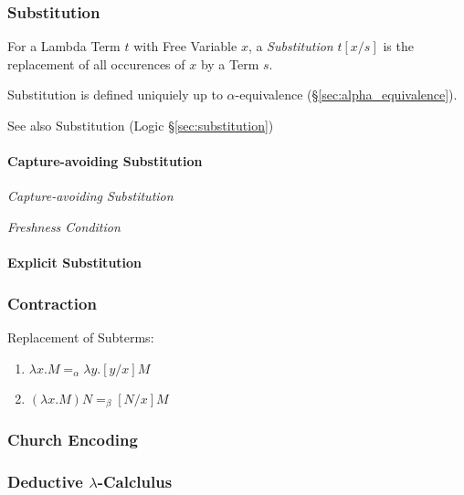 \subsubsection{Substitution}\label{sec:lambda_substitution}

For a Lambda Term $t$ with Free Variable $x$, a \emph{Substitution}
$t[x/s]$ is the replacement of all occurences of $x$ by a Term $s$.

Substitution is defined uniquiely up to $\alpha$-equivalence
(\S\ref{sec:alpha_equivalence}).

\fist See also Substitution (Logic \S\ref{sec:substitution})



\paragraph{Capture-avoiding Substitution}\label{sec:capture_avoiding}\hfill

\emph{Capture-avoiding Substitution}

\emph{Freshness Condition}



\paragraph{Explicit Substitution}\label{sec:explicit_substitution}\hfill



\subsubsection{Contraction}\label{sec:contraction}\cite{seldin03}

Replacement of Subterms:
\begin{enumerate}
  \item $\lambda x . M =_\alpha \lambda y . [y/x]M$
  \item $(\lambda x . M)N =_\beta [N/x]M$
\end{enumerate}



\subsubsection{Church Encoding}\label{sec:church_encoding}

\subsubsection{Deductive $\lambda$-Calclulus}\label{sec:deductive_lambda}

